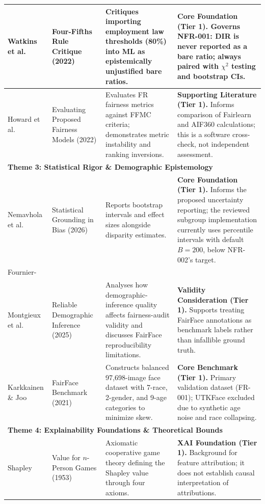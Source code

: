 \begin{center}
\begin{longtable}{|p{2.2cm}|p{2.6cm}|p{4.4cm}|p{4.4cm}|}
Watkins et al. \cite{watkins2022fourfifths} &
Four-Fifths Rule Critique (2022) &
Critiques importing employment law thresholds (80\%) into ML as epistemically unjustified bare ratios. &
\textbf{Core Foundation (Tier 1).} Governs NFR-001: DIR is never reported as a bare ratio; always paired with $\chi^2$ testing and bootstrap CIs. \\
\hline

Howard et al. \cite{howard2022evaluating} &
Evaluating Proposed Fairness Models (2022) &
Evaluates FR fairness metrics against FFMC criteria; demonstrates metric instability and ranking inversions. &
\textbf{Supporting Literature (Tier 1).} Informs comparison of Fairlearn and AIF360 calculations; this is a software cross-check, not independent assessment. \\
\hline

\multicolumn{4}{|l|}{\textbf{Theme 3: Statistical Rigor \& Demographic Epistemology}} \\
\hline
Nemavhola et al. \cite{nemavhola2026reassessing} &
Statistical Grounding in Bias (2026) &
Reports bootstrap intervals and effect sizes alongside disparity estimates. &
\textbf{Core Foundation (Tier 1).} Informs the proposed uncertainty reporting; the reviewed subgroup implementation currently uses percentile intervals with default $B=200$, below NFR-002's target. \\
\hline

Fournier-\\Montgieux et al. \cite{fourniermontgieux2025reliable} &
Reliable Demographic Inference (2025) &
Analyses how demographic-inference quality affects fairness-audit validity and discusses FairFace reproducibility limitations. &
\textbf{Validity Consideration (Tier 1).} Supports treating FairFace annotations as benchmark labels rather than infallible ground truth. \\
\hline

Karkkainen \& Joo \cite{karkkainen2021fairface} &
FairFace Benchmark (2021) &
Constructs balanced 97,698-image face dataset with 7-race, 2-gender, and 9-age categories to minimize skew. &
\textbf{Core Benchmark (Tier 1).} Primary validation dataset (FR-001); UTKFace excluded due to synthetic age noise and race collapsing. \\
\hline

\multicolumn{4}{|l|}{\textbf{Theme 4: Explainability Foundations \& Theoretical Bounds}} \\
\hline
Shapley \cite{shapley1953value} &
Value for $n$-Person Games (1953) &
Axiomatic cooperative game theory defining the Shapley value through four axioms. &
\textbf{XAI Foundation (Tier 1).} Background for feature attribution; it does not establish causal interpretation of attributions. \\
\hline


\end{longtable}
\end{center}
